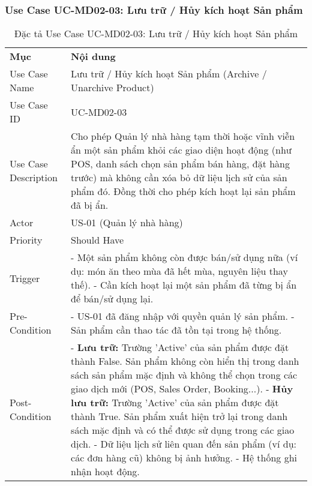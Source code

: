 \subsubsection{Use Case UC-MD02-03: Lưu trữ / Hủy kích hoạt Sản phẩm}



\begin{longtable}{|m{4cm}|p{11cm}|}
\caption{Đặc tả Use Case UC-MD02-03: Lưu trữ / Hủy kích hoạt Sản phẩm} \label{tab:uc_md02_03} \\
\hline

\endhead %

\hline
\endfoot %

\hline
\endlastfoot %
\multicolumn{2}{|c|}{\textbf{2.1. Tóm tắt (Summary)}} \\
\hline
\textbf{Mục} & \textbf{Nội dung} \\
\hline
Use Case Name & Lưu trữ / Hủy kích hoạt Sản phẩm (Archive / Unarchive Product) \\
\hline
Use Case ID & UC-MD02-03 \\
\hline
Use Case Description & Cho phép Quản lý nhà hàng tạm thời hoặc vĩnh viễn ẩn một sản phẩm khỏi các giao diện hoạt động (như POS, danh sách chọn sản phẩm bán hàng, đặt hàng trước) mà không cần xóa bỏ dữ liệu lịch sử của sản phẩm đó. Đồng thời cho phép kích hoạt lại sản phẩm đã bị ẩn. \\
\hline
Actor & US-01 (Quản lý nhà hàng) \\
\hline
Priority & Should Have \\
\hline
Trigger & - Một sản phẩm không còn được bán/sử dụng nữa (ví dụ: món ăn theo mùa đã hết mùa, nguyên liệu thay thế). \newline - Cần kích hoạt lại một sản phẩm đã từng bị ẩn để bán/sử dụng lại. \\
\hline
Pre-Condition & - US-01 đã đăng nhập với quyền quản lý sản phẩm. \newline - Sản phẩm cần thao tác đã tồn tại trong hệ thống. \\
\hline
Post-Condition & - \textbf{Lưu trữ:} Trường 'Active' của sản phẩm được đặt thành False. Sản phẩm không còn hiển thị trong danh sách sản phẩm mặc định và không thể chọn trong các giao dịch mới (POS, Sales Order, Booking...). \newline - \textbf{Hủy lưu trữ:} Trường 'Active' của sản phẩm được đặt thành True. Sản phẩm xuất hiện trở lại trong danh sách mặc định và có thể được sử dụng trong các giao dịch. \newline - Dữ liệu lịch sử liên quan đến sản phẩm (ví dụ: các đơn hàng cũ) không bị ảnh hưởng. \newline - Hệ thống ghi nhận hoạt động. \\

\end{longtable}
